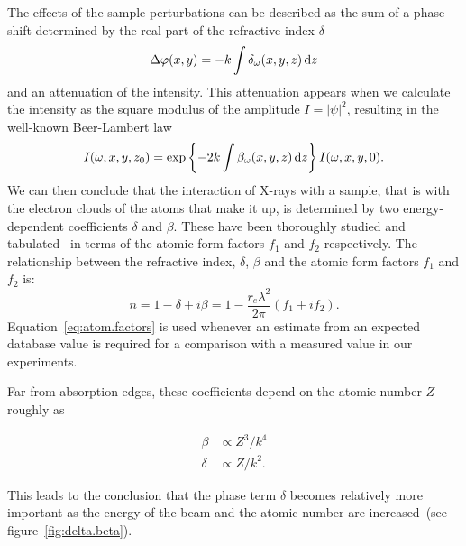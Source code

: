The effects of the sample perturbations can be described as the sum of
a phase shift determined by the real part of the refractive index $\delta$
\begin{equation}
    \Delta\varphi(x, y) = -k \int \delta_\omega(x, y, z) \operatorname{d}\!{z}
    \label{eq:phase.deviation}
\end{equation}
and an attenuation of the intensity. This attenuation appears when we
calculate the intensity as the square modulus of the
amplitude $I = |\psi|^2$, resulting in the well-known Beer-Lambert law
\begin{equation}
    I(\omega, x, y, z_0) = \exp\left\{-2k\int \beta_\omega(x, y, z) \operatorname{d}\!{z}\right\}
    I(\omega, x, y, 0).\label{eq:beer-lambert}
\end{equation}
We can then conclude that the interaction of X-rays with a sample, that is
with the electron clouds of the atoms that make it up, is determined by
two energy-dependent coefficients $\delta$ and $\beta$. These have been
thoroughly studied and tabulated~\parencite{nist} in terms of the atomic form
factors $f_1$ and $f_2$ respectively. The relationship between the
refractive index, $\delta$, $\beta$ and the atomic form factors $f_1$ and
$f_2$ is:
\begin{equation}
    n = 1 - \delta + i\beta = 1 - \frac{r_e\lambda^2}{2\pi}(f_1 + if_2).
    \label{eq:atom.factors}
\end{equation}
Equation~\eqref{eq:atom.factors} is used whenever an estimate from an
expected database value is required for a comparison with a measured
value in our experiments.

Far from absorption edges, these coefficients depend on the atomic number
$Z$ roughly as~\parencite{knoll2000radiation,Momose2005}

\begin{align}
    \beta &\propto Z^3 / k^4\\
    \delta &\propto Z / k^2.
    \label{eq:delta.beta.energy}
\end{align}

This leads to the conclusion that the phase term $\delta$ becomes
relatively more important as the energy of the beam and the atomic number
are increased~(see figure~\ref{fig:delta.beta}). 

